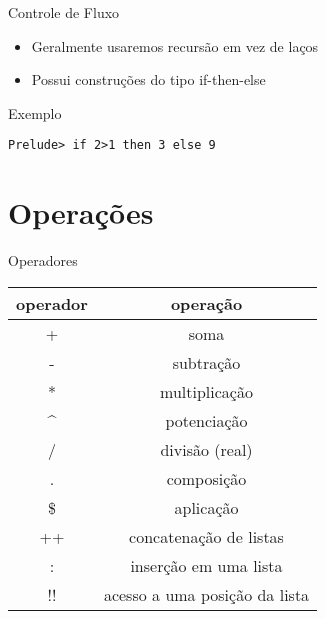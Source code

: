 \documentclass{beamer}
\begin{document}
	\begin{frame}[fragile]{Controle de Fluxo}
		\begin{itemize}
		 \item Geralmente usaremos recursão em vez de laços
		 \item Possui construções do tipo if-then-else
		\end{itemize}
		
		\begin{block}{Exemplo}
		 \begin{lstlisting}
Prelude> if 2>1 then 3 else 9
		 \end{lstlisting}
		\end{block}
	\end{frame}
	
	\section{Operações}
	\begin{frame}{Operadores}
	 \begin{table}[h]
	  \centering
	  \begin{tabular}{c | c}
			operador & operação\\
			\hline
			+ & soma \\
			- & subtração \\
			* & multiplicação\\
			\textasciicircum & potenciação\\
			/ & divisão (real)\\
			. & composição \\
			\$ & aplicação \\
			++ & concatenação de listas\\
			: & inserção em uma lista\\
			!! & acesso a uma posição da lista\\			
	  \end{tabular}
	 \end{table}	 
	\end{frame}
	
\end{document}
